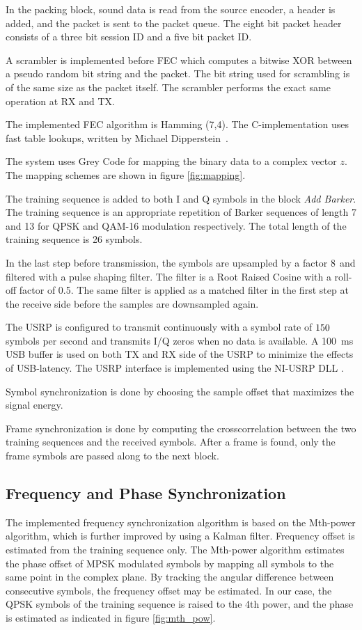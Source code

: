 In the packing block, sound data is read from the source encoder, a header is added, and the packet is sent to the packet queue. The eight bit packet header consists of a three bit session ID and a five bit packet ID. 

A scrambler is implemented before FEC which computes a bitwise XOR between a pseudo random bit string and the packet. The bit string used for scrambling is of the same size as the packet itself. The scrambler performs the exact same operation at RX and TX.

The implemented FEC algorithm is Hamming (7,4). The C-implementation uses fast table lookups, written by Michael Dipperstein~\cite{hamming}. 

The system uses Grey Code for mapping the binary data to a complex vector $z$. The mapping schemes are shown in figure \ref{fig:mapping}.



The training sequence is added to both I and Q symbols in the block \textit{Add Barker}. The training sequence is an appropriate repetition of Barker sequences of length 7 and 13 for QPSK and QAM-16 modulation respectively. The total length of the training sequence is 26 symbols. 

In the last step before transmission, the symbols are upsampled by a factor $8$ and filtered with a pulse shaping filter. The filter is a Root Raised Cosine with a roll-off factor of 0.5. The same filter is applied as a matched filter in the first step at the receive side before the samples are downsampled again. 

The USRP is configured to transmit continuously with a symbol rate of $150$ symbols per second and transmits I/Q zeros when no data is available. A \SI{100}{ms} USB buffer is used on both TX and RX side of the USRP to minimize the effects of USB-latency. The USRP interface is implemented using the NI-USRP DLL \cite{labviewDLL}.

Symbol synchronization is done by choosing the sample offset that maximizes the signal energy. 

Frame synchronization is done by computing the crosscorrelation between the two training sequences and the received symbols. After a frame is found, only the frame symbols are passed along to the next block.

\subsection{Frequency and Phase Synchronization}
The implemented frequency synchronization algorithm is based on the Mth-power algorithm\cite{viterbi}, which is further improved by using a Kalman filter. Frequency offset is estimated from the training sequence only. The Mth-power algorithm estimates the phase offset of MPSK modulated symbols by mapping all symbols to the same point in the complex plane. By tracking the angular difference between consecutive symbols, the frequency offset may be estimated. In our case, the QPSK symbols of the training sequence is raised to the 4th power, and the phase is estimated as indicated in figure \ref{fig:mth_pow}.


